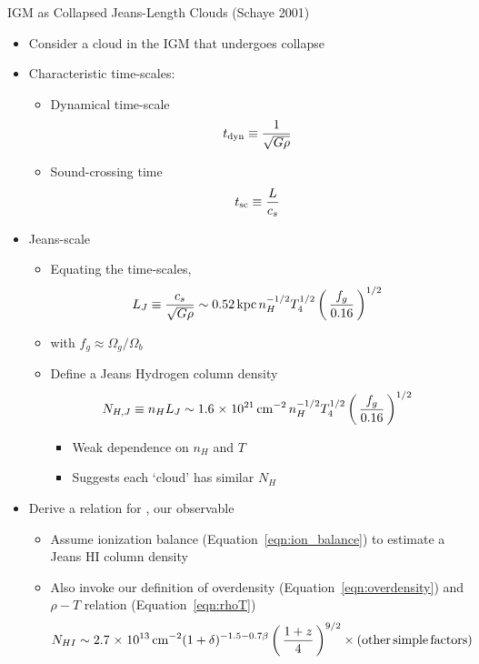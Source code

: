 \documentclass[12pt,letterpaper]{article}
\begin{document}
\begin{Aenumerate}
{\bf \item IGM as Collapsed Jeans-Length Clouds (Schaye 2001)}
	\begin{itemize}
	\item Consider a cloud in the IGM that undergoes collapse
	\item Characteristic time-scales:
		\begin{itemize}
		\item Dynamical time-scale
		\begin{equation}
		t_{\rm dyn} \equiv \frac{1}{\sqrt{G \rho}}
		\end{equation}
		\item Sound-crossing time
		\begin{equation}
		t_{\rm sc} \equiv \frac{L}{c_s}
		\end{equation}
		\end{itemize}
	\item Jeans-scale
		\begin{itemize}
		\item Equating the time-scales,
		\begin{equation}
		L_J \equiv \frac{c_s}{\sqrt{G\rho}} \sim 
		0.52 \, {\rm kpc} \, n_{H}^{-1/2} T_4^{1/2} \left ( \, \frac{f_g}{0.16} \, \right )^{1/2}
		\end{equation}
		\item with $f_g \approx \Omega_g/\Omega_b$
		\item Define a Jeans Hydrogen column density
		\begin{equation}
		N_{H,J} \equiv n_H L_J \sim 1.6 {\; \times \; 10^{21}} \, {\rm cm^{-2}} \,
		n_{H}^{-1/2} T_4^{1/2} \left ( \, \frac{f_g}{0.16} \, \right )^{1/2}
		\end{equation}
			\begin{itemize}
			\item Weak dependence on $n_H$ and $T$
			\item Suggests each `cloud' has similar $N_H$ 
			\end{itemize}
		\end{itemize}
	\item Derive a relation for \nhi, our observable
		\begin{itemize}
		\item Assume ionization balance (Equation~\ref{eqn:ion_balance}) to 
		estimate a Jeans HI column density
		\item Also invoke our definition of overdensity (Equation~\ref{eqn:overdensity}) and $\rho-T$ relation (Equation~\ref{eqn:rhoT})
		\begin{equation}
		N_{HI} \sim 2.7{\; \times \; 10^{13}} \, {\rm cm^{-2}} (1+\delta)^{-1.5 - 0.7\beta}
		\left ( \, \frac{1+z}{4} \, \right )^{9/2} \times (\rm other \, simple \, factors)
		\end{equation}
		\end{itemize}



\end{itemize}
\end{Aenumerate}
\end{document}
